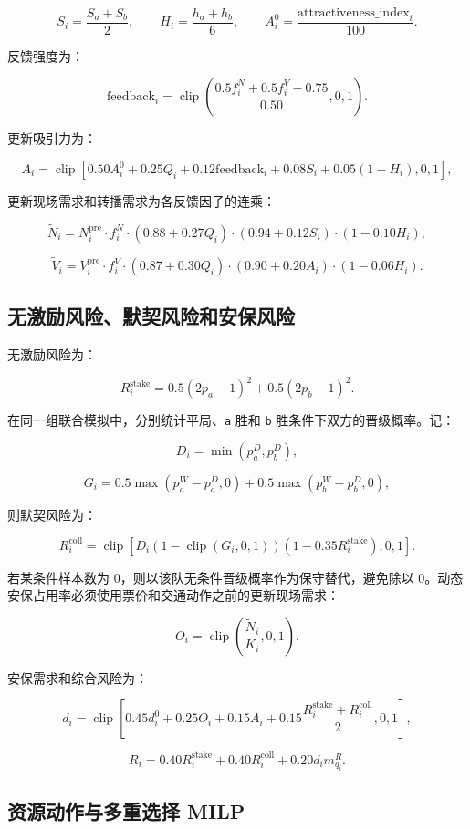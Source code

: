 \[
S_i=\frac{S_a+S_b}{2},\qquad
H_i=\frac{h_a+h_b}{6},\qquad
A_i^0=\frac{\mathrm{attractiveness\_index}_i}{100}.
\]

反馈强度为：

\[
\mathrm{feedback}_i=\operatorname{clip}\left(
\frac{0.5f_i^N+0.5f_i^V-0.75}{0.50},0,1
\right).
\]

更新吸引力为：

\[
A_i=\operatorname{clip}\left[
0.50A_i^0+0.25Q_i+0.12\mathrm{feedback}_i
+0.08S_i+0.05(1-H_i),0,1
\right],
\]

更新现场需求和转播需求为各反馈因子的连乘：

\[
\widetilde N_i=N_i^{\mathrm{pre}}\cdot f_i^N
\cdot(0.88+0.27Q_i)\cdot(0.94+0.12S_i)\cdot(1-0.10H_i),
\]

\[
\widetilde V_i=V_i^{\mathrm{pre}}\cdot f_i^V
\cdot(0.87+0.30Q_i)\cdot(0.90+0.20A_i)\cdot(1-0.06H_i).
\]

\subsection{无激励风险、默契风险和安保风险}

无激励风险为：

\[
R_i^{\mathrm{stake}}=
0.5(2p_a-1)^2+0.5(2p_b-1)^2.
\]

在同一组联合模拟中，分别统计平局、\texttt{a} 胜和 \texttt{b} 胜条件下双方的晋级概率。记：

\[
D_i=\min(p_a^D,p_b^D),
\]

\[
G_i=0.5\max(p_a^W-p_a^D,0)
+0.5\max(p_b^W-p_b^D,0),
\]

则默契风险为：

\[
R_i^{\mathrm{coll}}=\operatorname{clip}\left[
D_i\left(1-\operatorname{clip}(G_i,0,1)\right)
\left(1-0.35R_i^{\mathrm{stake}}\right),0,1
\right].
\]

若某条件样本数为 0，则以该队无条件晋级概率作为保守替代，避免除以 0。动态安保占用率必须使用票价和交通动作之前的更新现场需求：

\[
O_i=\operatorname{clip}\left(\frac{\widetilde N_i}{K_i},0,1\right).
\]

安保需求和综合风险为：

\[
d_i=\operatorname{clip}\left[
0.45d_i^0+0.25O_i+0.15A_i
+0.15\frac{R_i^{\mathrm{stake}}+R_i^{\mathrm{coll}}}{2},0,1
\right],
\]

\[
R_i=0.40R_i^{\mathrm{stake}}
+0.40R_i^{\mathrm{coll}}+0.20d_i m_{q_i}^{R}.
\]

\subsection{资源动作与多重选择 MILP}

